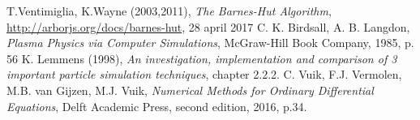 \begin{thebibliography}{9}
T.Ventimiglia, K.Wayne (2003,2011), \textit{The Barnes-Hut Algorithm}, \url{http://arborjs.org/docs/barnes-hut}, 28 april 2017
C. K. Birdsall, A. B. Langdon, \textit{Plasma Physics via Computer Simulations}, McGraw-Hill Book Company, 1985, p. 56
K. Lemmens (1998), \textit{An investigation, implementation and comparison of 3 important particle simulation techniques}, chapter 2.2.2.
C. Vuik, F.J. Vermolen, M.B. van Gijzen, M.J. Vuik, \textit{Numerical Methods for Ordinary Differential Equations}, Delft Academic Press, second edition, 2016, p.34.
\end{thebibliography}
